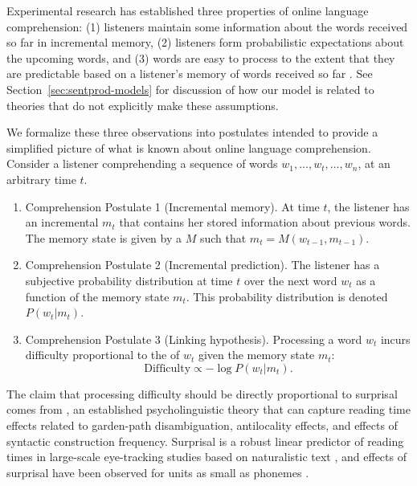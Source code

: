 Experimental research has established three properties of online language comprehension: (1) listeners maintain some information about the words received so far in incremental memory, (2) listeners form probabilistic expectations about the upcoming words, and (3) words are easy to process to the extent that they are predictable based on a listener's memory of words received so far \CITE.
See Section~\ref{sec:sentprod-models} for discussion of how our model is related to theories that do not explicitly make these assumptions.

We formalize these three observations into postulates intended to provide a simplified picture of what is known about online language comprehension. Consider a listener comprehending a sequence of words $w_1, \dots, w_t, \dots, w_n$, at an arbitrary time $t$.
\begin{enumerate}
    \item Comprehension Postulate 1 (Incremental memory). At time $t$, the listener has an incremental  $m_t$ that contains her stored information about previous words. The memory state is given by a  $M$ such that $m_t = M(w_{t-1}, m_{t-1})$.
    \item Comprehension Postulate 2 (Incremental prediction). The listener has a subjective probability distribution at time $t$ over the next word $w_t$ as a function of the memory state $m_t$. This probability distribution is denoted $P(w_t|m_t)$.
    
    \item Comprehension Postulate 3 (Linking hypothesis). Processing a word $w_t$ incurs difficulty proportional to the  of $w_t$ given the memory state $m_t$:
    \begin{equation}
    \label{eq:lossy-surp}
    \text{Difficulty} \propto -\log P(w_t | m_t).
\end{equation}
\end{enumerate}
The claim that processing difficulty should be directly proportional to surprisal comes from  \citep{hale2001probabilistic,levy2008expectation}, an established psycholinguistic theory that can capture reading time effects related to garden-path disambiguation, antilocality effects, and effects of syntactic construction frequency. Surprisal is a robust linear predictor of reading times in large-scale eye-tracking studies based on naturalistic text \citep{smith-effect-2013,goodkind-predictive-2018}, and effects of surprisal have been observed for units as small as phonemes \citep{} .

